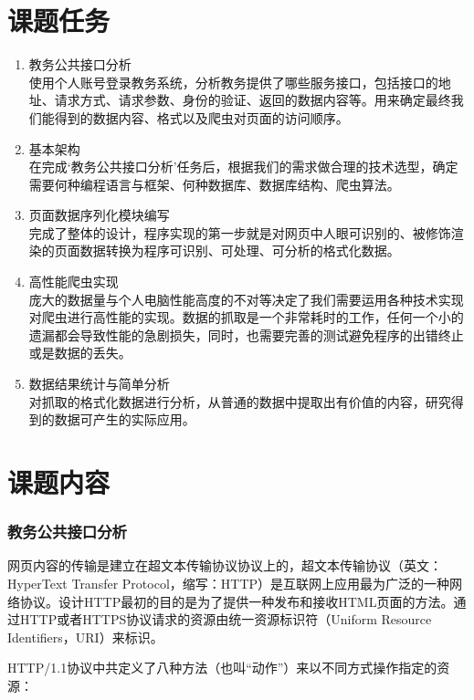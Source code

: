 \documentclass[UTF8, zihao=-4]{ctexart}
\begin{document}
    \part{课题任务}
    \begin{enumerate}
        \item 教务公共接口分析\\
            使用个人账号登录教务系统，分析教务提供了哪些服务接口，包括接口的地址、请求方式、请求参数、身份的验证、返回的数据内容等。用来确定最终我们能得到的数据内容、格式以及爬虫对页面的访问顺序。
        \item 基本架构\\
            在完成‘教务公共接口分析’任务后，根据我们的需求做合理的技术选型，确定需要何种编程语言与框架、何种数据库、数据库结构、爬虫算法。
        \item 页面数据序列化模块编写\\
            完成了整体的设计，程序实现的第一步就是对网页中人眼可识别的、被修饰渲染的页面数据转换为程序可识别、可处理、可分析的格式化数据。
        \item 高性能爬虫实现\\
            庞大的数据量与个人电脑性能高度的不对等决定了我们需要运用各种技术实现对爬虫进行高性能的实现。数据的抓取是一个非常耗时的工作，任何一个小的遗漏都会导致性能的急剧损失，同时，也需要完善的测试避免程序的出错终止或是数据的丢失。
        \item 数据结果统计与简单分析\\
            对抓取的格式化数据进行分析，从普通的数据中提取出有价值的内容，研究得到的数据可产生的实际应用。
    \end{enumerate}
    
    \part{课题内容}
    \section{教务公共接口分析}
    网页内容的传输是建立在超文本传输协议协议上的，超文本传输协议（英文：HyperText Transfer Protocol，缩写：HTTP）是互联网上应用最为广泛的一种网络协议。设计HTTP最初的目的是为了提供一种发布和接收HTML页面的方法。通过HTTP或者HTTPS协议请求的资源由统一资源标识符（Uniform Resource Identifiers，URI）来标识。\cite{wiki:Hypertext_Transfer_Protocol}\par
    
    HTTP/1.1协议中共定义了八种方法（也叫“动作”）来以不同方式操作指定的资源：
        
\end{document}

